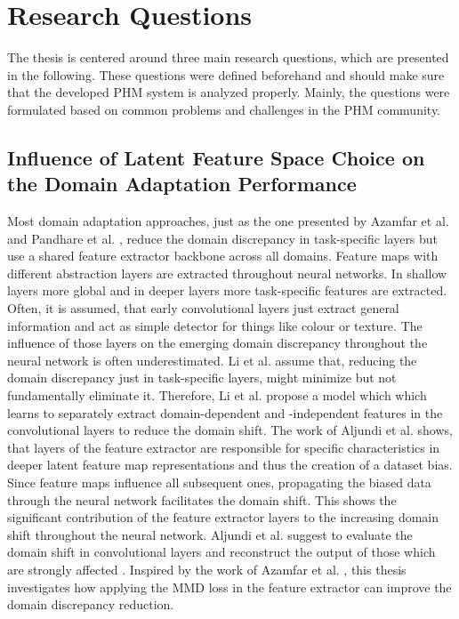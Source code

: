 \section{Research Questions}
The thesis is centered around three main research questions, which are presented in the following. These questions were defined beforehand and should make sure that the developed PHM system is analyzed properly. Mainly, the questions were formulated based on common problems and challenges in the PHM community. 

\subsection{Influence of Latent Feature Space Choice on the Domain Adaptation Performance}
Most domain adaptation approaches, just as the one presented by Azamfar et al. \cite{AZAMFAR2020103932} and Pandhare et al. \cite{Pandhare2021}, reduce the domain discrepancy in task-specific layers but use a shared feature extractor backbone across all domains. Feature maps with different abstraction layers are extracted throughout neural networks. In shallow layers more global and in deeper layers more task-specific features are extracted. Often, it is assumed, that early convolutional layers just extract general information and act as simple detector for things like colour or texture. The influence of those layers on the emerging domain discrepancy throughout the neural network is often underestimated. Li et al. \cite{li2020} assume that, reducing the domain discrepancy just in task-specific layers, might minimize but not fundamentally eliminate it. Therefore, Li et al. \cite{li2020} propose a model which which learns to separately extract domain-dependent and -independent features in the convolutional layers to reduce the domain shift. The work of Aljundi et al. \cite{Aljundi2016} shows, that layers of the feature extractor are responsible for specific characteristics in deeper latent feature map representations and thus the creation of a dataset bias. Since feature maps influence all subsequent ones, propagating the biased data through the neural network facilitates the domain shift. This shows the significant contribution of the feature extractor layers to the increasing domain shift throughout the neural network. Aljundi et al. suggest to evaluate the domain shift in convolutional layers and reconstruct the output of those which are strongly affected \cite{Aljundi2016}. Inspired by the work of Azamfar et al. \cite{Aljundi2016}, this thesis investigates how applying the MMD loss in the feature extractor can improve the domain discrepancy reduction.


